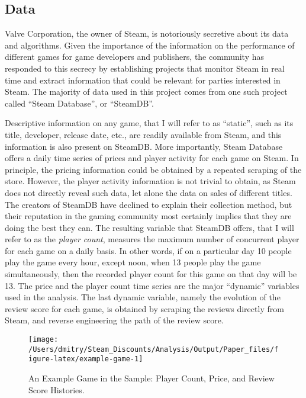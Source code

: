 \documentclass[
  12pt,
  pagebackref]{article}
\begin{document}
\hypertarget{data}{%
\subsection{Data}\label{data}}

Valve Corporation, the owner of Steam, is notoriously secretive about
its data and algorithms. Given the importance of the information on the
performance of different games for game developers and publishers, the
community has responded to this secrecy by establishing projects that
monitor Steam in real time and extract information that could be
relevant for parties interested in Steam. The majority of data used in
this project comes from one such project called ``Steam Database'', or
``SteamDB''.

Descriptive information on any game, that I will refer to as ``static'',
such as its title, developer, release date, etc., are readily available
from Steam, and this information is also present on SteamDB. More
importantly, Steam Database offers a daily time series of prices and
player activity for each game on Steam. In principle, the pricing
information could be obtained by a repeated scraping of the store.
However, the player activity information is not trivial to obtain, as
Steam does not directly reveal such data, let alone the data on sales of
different titles. The creators of SteamDB have declined to explain their
collection method, but their reputation in the gaming community most
certainly implies that they are doing the best they can. The resulting
variable that SteamDB offers, that I will refer to as the \emph{player
count}, measures the maximum number of concurrent player for each game
on a daily basis. In other words, if on a particular day 10 people play
the game every hour, except noon, when 13 people play the game
simultaneously, then the recorded player count for this game on that day
will be 13. The price and the player count time series are the major
``dynamic'' variables used in the analysis. The last dynamic variable,
namely the evolution of the review score for each game, is obtained by
scraping the reviews directly from Steam, and reverse engineering the
path of the review score.

\begin{figure}[h]

{\centering \texttt{[image: /Users/dmitry/Steam\_Discounts/Analysis/Output/Paper\_files/figure-latex/example-game-1]} 

}

\caption{\label{exampleGame} An Example Game in the Sample: Player Count, Price, and Review Score Histories.}\label{fig:example-game}
\end{figure}
\end{document}
